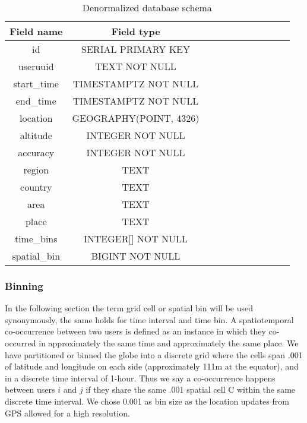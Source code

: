 \begin{table}[htbp]
\centering

\begin{tabular}{|c|c|c|c|c|c|c|c|c|c|c|}
\hline
\textbf{Field name} & \textbf{Field type}    \\
\hline
id                  & SERIAL PRIMARY KEY     \\
\hline
useruuid            & TEXT NOT NULL          \\
\hline
start\_time         & TIMESTAMPTZ NOT NULL   \\
\hline
end\_time           & TIMESTAMPTZ NOT NULL   \\
\hline
location            & GEOGRAPHY(POINT, 4326) \\
\hline
altitude            & INTEGER NOT NULL       \\
\hline
accuracy            & INTEGER NOT NULL       \\
\hline
region              & TEXT                   \\
\hline
country             & TEXT                   \\
\hline
area                & TEXT                   \\
\hline
place               & TEXT                   \\
\hline
time\_bins          & INTEGER{[}{]} NOT NULL \\
\hline
spatial\_bin        & BIGINT NOT NULL        \\
\hline
\end{tabular}
\caption{Denormalized database schema}
\label{table:schema_denormalized}
\end{table}

\subsubsection{Binning} \label{ssec:binning}
In the following section the term grid cell or spatial bin will be used synonymously, the same holds for time interval and time bin.
A spatiotemporal co-occurrence between two users is defined as an instance in which they co-occurred in approximately the same time and approximately the same place.
We have partitioned or binned the globe into a discrete grid where the cells span .001{\degree} of latitude and longitude on each side (approximately 111m at the equator), and in a discrete time interval of 1-hour.
Thus we say a co-occurrence happens between users $i$ and $j$ if they share the same .001{\degree} spatial cell C within the same discrete time interval. We chose 0.001 as bin size as the location updates from GPS allowed for a high resolution.

